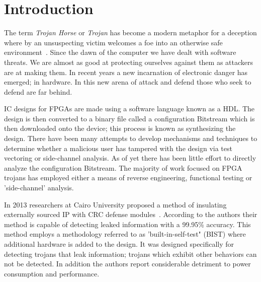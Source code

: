 \documentclass[conference]{IEEEtran}
\begin{document}




%
\IEEEpeerreviewmaketitle



\section{Introduction}
The term \textit{Trojan Horse} or \textit{Trojan} has become a modern metaphor for a deception where by an unsuspecting victim welcomes a foe into an otherwise safe environment~\cite{searchForTrojanWar}.
Since the dawn of the computer we have dealt with software threats.
We are almost as good at protecting ourselves against them as attackers are at making them.
In recent years a new incarnation of electronic danger has emerged; in hardware.
In this new arena of attack and defend those who seek to defend are far behind.

\acrfull{IC} designs for \acrfull{FPGAs} are made using a software language known as a \acrfull{HDL}.
The design is then converted to a binary file called a configuration \gls{Bitstream} which is then downloaded onto the device; this process is known as synthesizing the design.
There have been many attempts to develop mechanisms and techniques to determine whether a malicious user has tampered with the design via test vectoring or side-channel analysis.
As of yet there has been little effort to directly analyze the configuration \gls{Bitstream}.
The majority of work focused on \acrshort{FPGA} trojans has employed either a means of reverse engineering, functional testing or 'side-channel' analysis.

In 2013 researchers at Cairo University proposed a method of insulating externally sourced \acrshort{IP} with \acrfull{CRC} defense modules~\cite{crcDetection}.
According to the authors their method is capable of detecting leaked information with a 99.95\% accuracy.
This method employs a methodology referred to as 'built-in-self-test" (BIST) where additional hardware is added to the design.
It was designed specifically for detecting trojans that leak information; trojans which exhibit other behaviors can not be detected.
In addition the authors report considerable detriment to power consumption and performance.
\end{document}
